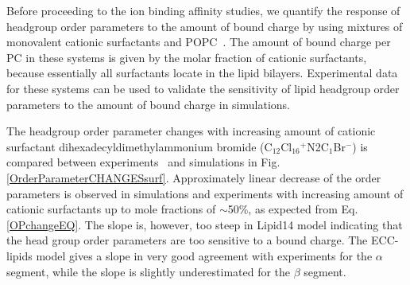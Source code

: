 \documentclass[aip,jcp,twocolumn]{revtex4}
\begin{document}
Before proceeding to the ion binding affinity studies, we quantify
the response of headgroup order parameters to the amount of 
bound charge by using mixtures of monovalent cationic surfactants
and POPC~\cite{scherer89}. The amount of bound charge per PC 
in these systems is given by the molar fraction of cationic 
surfactants, because essentially all surfactants locate in the 
lipid bilayers. Experimental data for these systems can be used to validate 
the sensitivity of lipid headgroup order parameters
to the amount of bound charge in simulations.

%

The headgroup order parameter changes with increasing amount of 
cationic surfactant dihexadecyldimethylammonium bromide (C$_{12}$Cl$_{16}$$^+$N2C$_1$Br$^-$) 
is compared between experiments~\cite{scherer89} and simulations in
Fig. \ref{OrderParameterCHANGESsurf}. 
Approximately linear decrease of the order parameters is observed
in simulations and experiments with increasing amount of cationic
surfactants up to mole fractions of $\sim$50\%,
as expected from Eq. \ref{OPchangeEQ}.
The slope is, however, too steep in Lipid14 model indicating that 
the head group order parameters are too sensitive to a bound charge.
The ECC-lipids model gives a slope in very good agreement with experiments
for the $\alpha$ segment, while the slope is slightly
underestimated for the $\beta$ segment.
\end{document}
